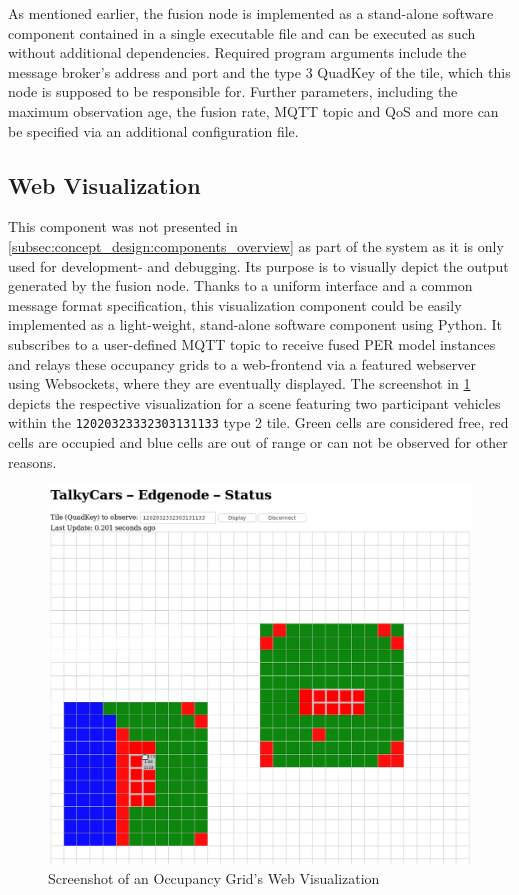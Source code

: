 As mentioned earlier, the fusion node is implemented as a stand-alone software component contained in a single executable file and can be executed as such without additional dependencies. Required program arguments include the message broker's address and port and the type 3 QuadKey of the tile, which this node is supposed to be responsible for. Further parameters, including the maximum observation age, the fusion rate, MQTT topic and QoS and more can be specified via an additional configuration file.

\subsection{Web Visualization}
\label{subsec:implementation:web_visualization}

This component was not presented in \cref{subsec:concept_design:components_overview} as part of the system as it is only used for development- and debugging. Its purpose is to visually depict the output generated by the fusion node. Thanks to a uniform interface and a common message format specification, this visualization component could be easily implemented as a light-weight, stand-alone software component using Python. It subscribes to a user-defined MQTT topic to receive fused PER model instances and relays these occupancy grids to a web-frontend via a featured webserver using Websockets, where they are eventually displayed. The screenshot in \cref{fig:screenshot_web_node} depicts the respective visualization for a scene featuring two participant vehicles within the \texttt{12020323332303131133} type 2 tile. Green cells are considered free, red cells are occupied and blue cells are out of range or can not be observed for other reasons.

\begin{figure}[h]
	\centering
	\includegraphics[width=0.8\linewidth]{98_images/screenshot_web_node}
	\caption{Screenshot of an Occupancy Grid's Web Visualization}
	\label{fig:screenshot_web_node}
\end{figure}

